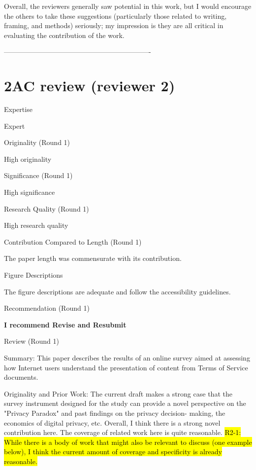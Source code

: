 Overall, the reviewers generally saw potential in this work, but I would encourage
the others to take these suggestions (particularly those related to
writing, framing, and methods) seriously; my impression is they are
all critical in evaluating the contribution of the work.

----------------------------------------------------------------

\section*{2AC review (reviewer 2)}

Expertise

Expert

Originality (Round 1)

High originality

Significance (Round 1)

High significance

Research Quality (Round 1)

High research quality

Contribution Compared to Length (Round 1)

The paper length was commensurate with its contribution.

Figure Descriptions

The figure descriptions are adequate and follow the accessibility guidelines.

Recommendation (Round 1)

\textbf{I recommend Revise and Resubmit}

Review (Round 1)

Summary: This paper describes the results of an online survey aimed at assessing
how Internet users understand the presentation of content from Terms
of Service documents.

Originality and Prior Work: The current draft makes a strong case that the survey
instrument designed for the study can provide a novel perspective on
the "Privacy Paradox" and past findings on the privacy decision-
making, the economics of digital privacy, etc. Overall, I think there
is a strong novel contribution here. The coverage of related work here
is quite reasonable. 
\hl{R2-1: While there is a body of work that might also be
relevant to discuss (one example below), I think the current amount of
coverage and specificity is already reasonable.}

